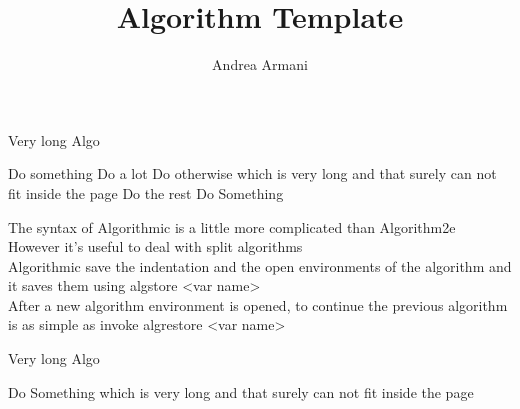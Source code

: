 \documentclass{article}
\title{Algorithm Template}
\author{Andrea Armani}
\begin{document}
\maketitle
    \begin{algorithm}
    \caption{Very long Algo}
    \begin{algorithmic}[1]
            \State Do something
                \State Do a lot
            \EndIf
                \State Do otherwise
                    \State which
               		\State is
               		\State very
               		\State long
               		\State and
               		\State that
               		\State surely
               		\State can
               		\State not
               		\State fit
               		\State inside
               		\State the
               		\State page
               \EndFor
            \Else
                \State Do the rest
                    \State Do
                    \State Something
               	\EndWhile
    \end{algorithmic}
    \end{algorithm}
    \bigbreak
The syntax of Algorithmic is a little more complicated than Algorithm2e\\
However it's useful to deal with split algorithms\\
Algorithmic save the indentation and the open environments of the algorithm and it saves them using algstore{ <var name> }\\
After a new algorithm environment is opened, to continue the previous algorithm is as simple as invoke algrestore{ <var name> }

    \begin{algorithm}[h]
    \caption{Very long Algo}
    \begin{algorithmic}[1]
            \State Do
            \State Something
            \State which
       		\State is
       		\State very
       		\State long
       		\State and
       		\State that
       		\State surely
       		\State can
       		\State not
       		\State fit
       		\State inside
       		\State the
       		\State page  
   	    \EndIf
    \EndFunction
        \end{algorithmic}
    \end{algorithm}
\end{document}
